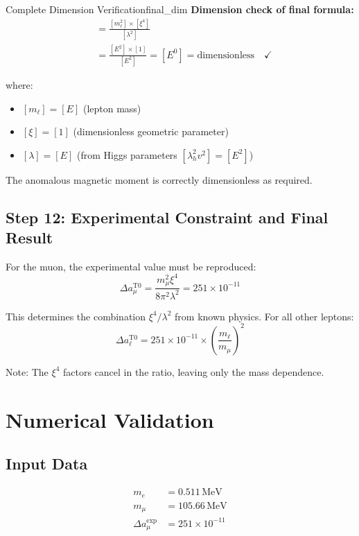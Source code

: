 \documentclass[12pt,a4paper]{article}
\begin{document}
	\begin{important}{Complete Dimension Verification}{final_dim}
		\textbf{Dimension check of final formula:}
		\begin{align}
			[\Delta a_\ell] &= \frac{[m_\ell^2] \times [\xi^4]}{[\lambda^2]} \\
			&= \frac{[E^2] \times [1]}{[E^2]} = [E^0] = \text{dimensionless} \quad \checkmark
		\end{align}
		
		where:
		\begin{itemize}
			\item $[m_\ell] = [E]$ (lepton mass)
			\item $[\xi] = [1]$ (dimensionless geometric parameter)  
			\item $[\lambda] = [E]$ (from Higgs parameters $[\lambda_h^2 v^2] = [E^2]$)
		\end{itemize}
		
		The anomalous magnetic moment is correctly dimensionless as required.
	\end{important}
	
	\subsection{Step 12: Experimental Constraint and Final Result}
	
	For the muon, the experimental value must be reproduced:
	\begin{equation}
		\Delta a_\mu^{\text{T0}} = \frac{m_\mu^2 \xi^4}{8\pi^2 \lambda^2} = 251 \times 10^{-11}
	\end{equation}
	
	This determines the combination $\xi^4/\lambda^2$ from known physics. For all other leptons:
	\begin{equation}
		\boxed{\Delta a_\ell^{\text{T0}} = 251 \times 10^{-11} \times \left(\frac{m_\ell}{m_\mu}\right)^2}
		\label{eq:final_formula}
	\end{equation}
	
	Note: The $\xi^4$ factors cancel in the ratio, leaving only the mass dependence.
	
	\section{Numerical Validation}
	
	\subsection{Input Data}
	\begin{align*}
		m_e &= 0.511\,\text{MeV} \\
		m_\mu &= 105.66\,\text{MeV} \\
		\Delta a_\mu^{\text{exp}} &= 251 \times 10^{-11}
	\end{align*}
	
\end{document}
